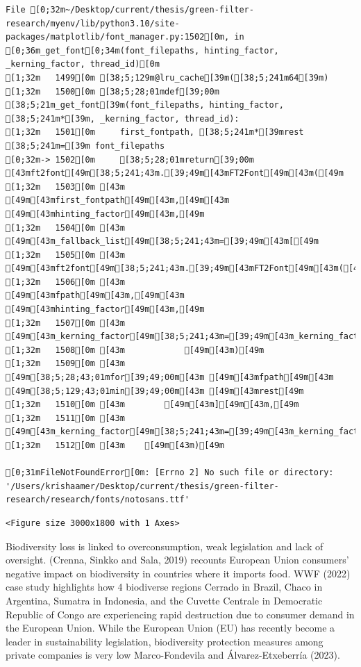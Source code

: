 \documentclass[
  letterpaper,
  DIV=11,
  numbers=noendperiod]{scrartcl}
\begin{document}
\begin{verbatim}
File [0;32m~/Desktop/current/thesis/green-filter-research/myenv/lib/python3.10/site-packages/matplotlib/font_manager.py:1502[0m, in [0;36m_get_font[0;34m(font_filepaths, hinting_factor, _kerning_factor, thread_id)[0m
[1;32m   1499[0m [38;5;129m@lru_cache[39m([38;5;241m64[39m)
[1;32m   1500[0m [38;5;28;01mdef[39;00m [38;5;21m_get_font[39m(font_filepaths, hinting_factor, [38;5;241m*[39m, _kerning_factor, thread_id):
[1;32m   1501[0m     first_fontpath, [38;5;241m*[39mrest [38;5;241m=[39m font_filepaths
[0;32m-> 1502[0m     [38;5;28;01mreturn[39;00m [43mft2font[49m[38;5;241;43m.[39;49m[43mFT2Font[49m[43m([49m
[1;32m   1503[0m [43m        [49m[43mfirst_fontpath[49m[43m,[49m[43m [49m[43mhinting_factor[49m[43m,[49m
[1;32m   1504[0m [43m        [49m[43m_fallback_list[49m[38;5;241;43m=[39;49m[43m[[49m
[1;32m   1505[0m [43m            [49m[43mft2font[49m[38;5;241;43m.[39;49m[43mFT2Font[49m[43m([49m
[1;32m   1506[0m [43m                [49m[43mfpath[49m[43m,[49m[43m [49m[43mhinting_factor[49m[43m,[49m
[1;32m   1507[0m [43m                [49m[43m_kerning_factor[49m[38;5;241;43m=[39;49m[43m_kerning_factor[49m
[1;32m   1508[0m [43m            [49m[43m)[49m
[1;32m   1509[0m [43m            [49m[38;5;28;43;01mfor[39;49;00m[43m [49m[43mfpath[49m[43m [49m[38;5;129;43;01min[39;49;00m[43m [49m[43mrest[49m
[1;32m   1510[0m [43m        [49m[43m][49m[43m,[49m
[1;32m   1511[0m [43m        [49m[43m_kerning_factor[49m[38;5;241;43m=[39;49m[43m_kerning_factor[49m
[1;32m   1512[0m [43m    [49m[43m)[49m

[0;31mFileNotFoundError[0m: [Errno 2] No such file or directory: '/Users/krishaamer/Desktop/current/thesis/green-filter-research/research/fonts/notosans.ttf'
\end{verbatim}

\begin{verbatim}
<Figure size 3000x1800 with 1 Axes>
\end{verbatim}

Biodiversity loss is linked to overconsumption, weak legislation and
lack of oversight. (Crenna, Sinkko and Sala, 2019) recounts European
Union consumers' negative impact on biodiversity in countries where it
imports food. WWF (2022) case study highlights how 4 biodiverse regions
Cerrado in Brazil, Chaco in Argentina, Sumatra in Indonesia, and the
Cuvette Centrale in Democratic Republic of Congo are experiencing rapid
destruction due to consumer demand in the European Union. While the
European Union (EU) has recently become a leader in sustainability
legislation, biodiversity protection measures among private companies is
very low Marco-Fondevila and Álvarez-Etxeberría (2023).
\end{document}
